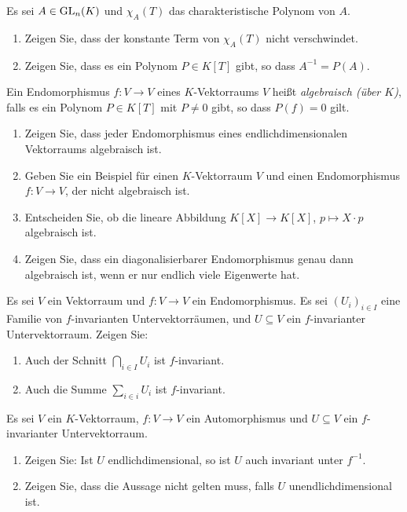 \begin{question}
  Es sei $A \in \operatorname{GL}_n(K)$ und $\chi_A(T)$ das charakteristische Polynom von $A$.
  \begin{enumerate}[leftmargin=*]
    \item
      Zeigen Sie, dass der konstante Term von $\chi_A(T)$ nicht verschwindet.
    \item
      Zeigen Sie, dass es ein Polynom $P \in K[T]$ gibt, so dass $A^{-1} = P(A)$.
  \end{enumerate}
\end{question}


\begin{question}
  Ein Endomorphismus $f \colon V \to V$ eines $K$-Vektorraums $V$ heißt \emph{algebraisch (über $K$)}, falls es ein Polynom $P \in K[T]$ mit $P \neq 0$ gibt, so dass $P(f) = 0$ gilt.
  \begin{enumerate}[leftmargin=*]
    \item
      Zeigen Sie, dass jeder Endomorphismus eines endlichdimensionalen Vektorraums algebraisch ist.
    \item
      Geben Sie ein Beispiel für einen $K$-Vektorraum $V$ und einen Endomorphismus $f \colon V \to V$, der nicht algebraisch ist.
    \item
      Entscheiden Sie, ob die lineare Abbildung $K[X] \to K[X]$, $p \mapsto X \cdot p$ algebraisch ist.
    \item
      Zeigen Sie, dass ein diagonalisierbarer Endomorphismus genau dann algebraisch ist, wenn er nur endlich viele Eigenwerte hat.
  \end{enumerate}
\end{question}


\begin{question}
  Es sei $V$ ein Vektorraum und $f \colon V \to V$ ein Endomorphismus.
  Es sei $(U_i)_{i \in I}$ eine Familie von $f$-invarianten Untervektorräumen, und $U \subseteq V$ ein $f$-invarianter Untervektorraum.
  Zeigen Sie:
  \begin{enumerate}[leftmargin=*]
    \item
      Auch der Schnitt $\bigcap_{i \in I} U_i$ ist $f$-invariant.
    \item
      Auch die Summe $\sum_{i \in i} U_i$ ist $f$-invariant.
  \end{enumerate}
\end{question}


\begin{question}
  Es sei $V$ ein $K$-Vektorraum, $f \colon V \to V$ ein Automorphismus und $U \subseteq V$ ein $f$-invarianter Untervektorraum.
  \begin{enumerate}[leftmargin=*]
    \item
      Zeigen Sie:
      Ist $U$ endlichdimensional, so ist $U$ auch invariant unter $f^{-1}$.
    \item
      Zeigen Sie, dass die Aussage nicht gelten muss, falls $U$ unendlichdimensional ist.
  \end{enumerate}
\end{question}


